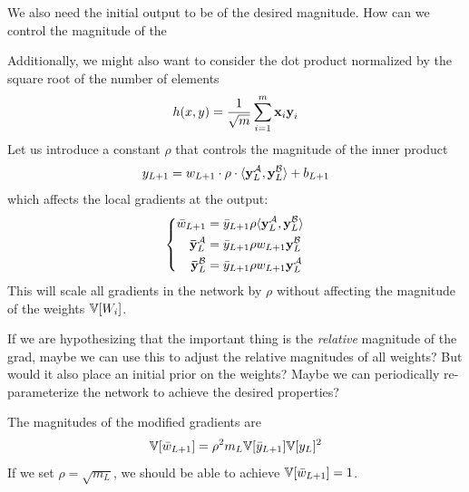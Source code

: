 We also need the initial output to be of the desired magnitude.
How can we control the magnitude of the 

\vspace{2em}

Additionally, we might also want to consider the dot product normalized by the square root of the number of elements
\begin{equation}
h(x, y) = \frac{1}{\sqrt{m}} \sum_{i = 1}^{m} \boldsymbol{\mathbf{x}}_{i} \boldsymbol{\mathbf{y}}_{i}
\end{equation}
Let us introduce a constant $\rho$ that controls the magnitude of the inner product
\begin{equation}
y_{L+1} = w_{L+1} \cdot \rho \cdot \langle \boldsymbol{\mathbf{y}}_{L}^{\mathcal{A}},  \boldsymbol{\mathbf{y}}_{L}^{\mathcal{B}} \rangle + b_{L+1}
\end{equation}
which affects the local gradients at the output:
\begin{equation}
\left\{ \begin{aligned}
\bar{w}_{L+1} & = \bar{y}_{L+1} \rho \langle \boldsymbol{\mathbf{y}}_{L}^{\mathcal{A}}, \boldsymbol{\mathbf{y}}_{L}^{\mathcal{B}} \rangle \\
\boldsymbol{\mathbf{\bar{y}}}_{L}^{\mathcal{A}} & = \bar{y}_{L+1} \rho w_{L+1} \boldsymbol{\mathbf{y}}_{L}^{\mathcal{B}} \\
\boldsymbol{\mathbf{\bar{y}}}_{L}^{\mathcal{B}} & = \bar{y}_{L+1} \rho w_{L+1} \boldsymbol{\mathbf{y}}_{L}^{\mathcal{A}}
\end{aligned} \right.
\end{equation}
This will scale all gradients in the network by $\rho$ without affecting the magnitude of the weights $\mathbb{V}[W_{i}]$.

If we are hypothesizing that the important thing is the \emph{relative} magnitude of the grad, maybe we can use this to adjust the relative magnitudes of all weights?
But would it also place an initial prior on the weights?
Maybe we can periodically re-parameterize the network to achieve the desired properties?

The magnitudes of the modified gradients are
\begin{align}
\mathbb{V}[\bar{w}_{L+1}] = \rho^{2} m_{L} \mathbb{V}[\bar{y}_{L+1}] \mathbb{V}[y_{L}]^{2}
\end{align}
If we set $\rho = \sqrt{m_{L}}$, we should be able to achieve $\mathbb{V}[\bar{w}_{L+1}] = 1$.



